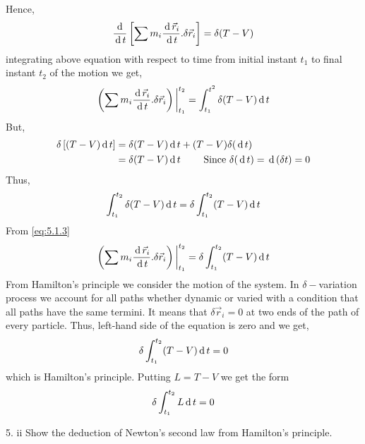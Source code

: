 \documentclass[12pt]{article}
\begin{document}
\begin{soln}
    Hence,
    \[\frac{\,\mathrm{d}\,}{\,\mathrm{d}\, t}\left[ \sum m_i\frac{\,\mathrm{d}\,\vec{r}_i}{\,\mathrm{d}\, t}.\delta \vec{r}_i \right]=\delta(T-V)\]
    integrating above equation with respect to time from initial instant \(t_1\) to final instant \(t_2\) of the motion we get,
    \begin{equation}
        \left( \sum m_i \frac{\,\mathrm{d}\,\vec{r}_i}{\,\mathrm{d}\, t}.\delta \vec{r}_i \right)\bigg\vert_{t_1}^{t_2}=\int_{t_1}^{t^2}\delta (T-V)\,\mathrm{d}\, t \label{eq:5.1.3}
    \end{equation}
    But,
    \begin{align*}
        \delta\left[ (T-V)\,\mathrm{d}\, t \right]&=\delta(T-V)\,\mathrm{d}\, t+(T-V)\delta(\,\mathrm{d}\, t)\\
        &=\delta(T-V)\,\mathrm{d}\, t\qquad \text{ Since }\delta(\,\mathrm{d}\, t)=\,\mathrm{d}\,(\delta t)=0
    \end{align*}
    Thus,
    \[\int_{t_1}^{t_2}\delta(T-V) \,\mathrm{d}\, t=\delta \int_{t_1}^{t_2}(T-V)\,\mathrm{d}\, t\]
    From \eqref{eq:5.1.3}
    \[\left( \sum m_i \frac{\,\mathrm{d}\,\vec{r}_i}{\,\mathrm{d}\, t}.\delta \vec{r}_i \right)\bigg\vert_{t_1}^{t_2}=\delta \int_{t_1}^{t_2}(T-V)\,\mathrm{d}\, t\]
    From Hamilton's principle we consider the motion of the system. In \(\delta-\)variation process we account for all paths whether dynamic or varied with a condition that all paths have the same termini. It means that \(\delta \vec{r}_i=0\) at two ends of the path of every particle. Thus, left-hand side of the equation is zero and we get,
    \[\delta \int_{t_1}^{t_2}(T-V)\,\mathrm{d}\, t=0\]
    which is Hamilton's principle. Putting \(L=T-V\) we get the form
    \[\delta \int_{t_1}^{t_2}L\,\mathrm{d}\, t=0\]
\end{soln}
\begin{prob}{5. ii}
    Show the deduction of Newton's second law from Hamilton's principle.
\end{prob}
\end{document}
